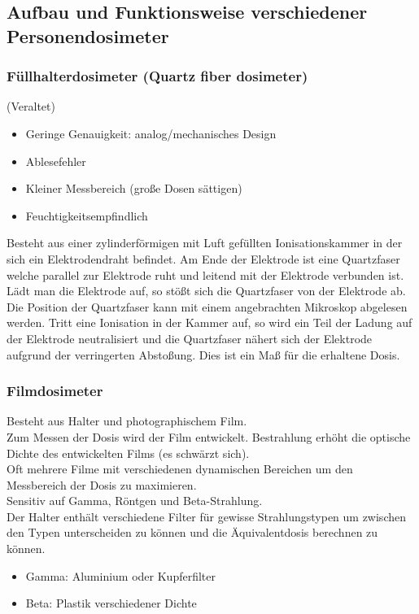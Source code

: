 \documentclass[11pt, a4paper]{article}
\numberwithin{equation}{section}
\begin{document}
\subsection{Aufbau und Funktionsweise verschiedener Personendosimeter}

\subsubsection{Füllhalterdosimeter (Quartz fiber dosimeter)}
(Veraltet)
\begin{itemize}
	\item Geringe Genauigkeit: analog/mechanisches Design
	\item Ablesefehler
	\item Kleiner Messbereich (große Dosen sättigen)
	\item Feuchtigkeitsempfindlich
\end{itemize}
Besteht aus einer zylinderförmigen mit Luft gefüllten Ionisationskammer in der sich ein Elektrodendraht befindet.
Am Ende der Elektrode ist eine Quartzfaser welche parallel zur Elektrode ruht und leitend mit der Elektrode verbunden ist.
Lädt man die Elektrode auf, so stößt sich die Quartzfaser von der Elektrode ab.
Die Position der Quartzfaser kann mit einem angebrachten Mikroskop abgelesen werden.
Tritt eine Ionisation in der Kammer auf, so wird ein Teil der Ladung auf der Elektrode neutralisiert und die Quartzfaser nähert sich der Elektrode aufgrund der verringerten Abstoßung.
Dies ist ein Maß für die erhaltene Dosis.

\subsubsection{Filmdosimeter}
Besteht aus Halter und photographischem Film.\\
Zum Messen der Dosis wird der Film entwickelt. Bestrahlung erhöht die optische Dichte des entwickelten Films (es schwärzt sich).\\
Oft mehrere Filme mit verschiedenen dynamischen Bereichen um den Messbereich der Dosis zu maximieren.\\
Sensitiv auf Gamma, Röntgen und Beta-Strahlung.\\
Der Halter enthält verschiedene Filter für gewisse Strahlungstypen um zwischen den Typen unterscheiden zu können und die Äquivalentdosis berechnen zu können.\\
\begin{itemize}
	\item Gamma: Aluminium oder Kupferfilter
	\item Beta: Plastik verschiedener Dichte
\end{itemize}
\end{document}
